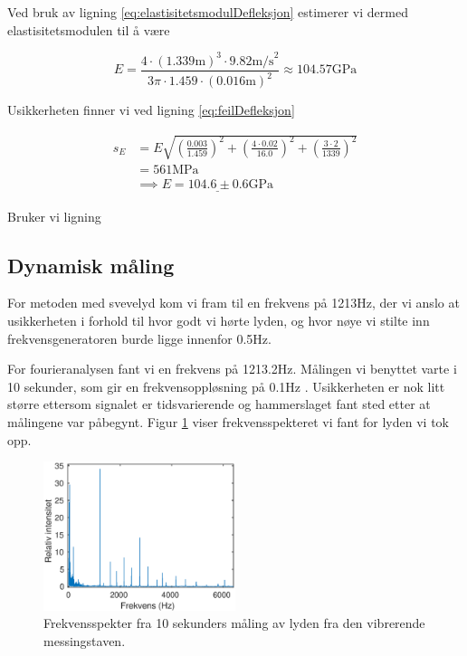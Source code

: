 \documentclass[a4paper,11pt, twocolumn]{article}
\begin{document}
Ved bruk av ligning \eqref{eq:elastisitetsmodulDefleksjon} estimerer vi dermed elastisitetsmodulen til å være

\begin{equation}
	E = \frac{4\cdot(1.339\text{m})^3\cdot9.82\text{m/s}^2}{3\pi\cdot 1.459\cdot (0.016\text{m})^2} \approx 104.57\text{GPa}
\end{equation}

Usikkerheten finner vi ved ligning \eqref{eq:feilDefleksjon}

\begin{align}
	s_E &= E\sqrt{\left(\frac{0.003}{1.459}\right)^2+\left(\frac{4\cdot0.02}{16.0}\right)^2+\left(\frac{3\cdot 2}{1339}\right)^2}\\
	&= 561\text{MPa}\\
	&\implies \underline{E = 104.6\pm0.6\text{GPa}}
\end{align}

Bruker vi ligning


\subsection{Dynamisk måling}
For metoden med svevelyd kom vi fram til en frekvens på 1213Hz, der vi anslo at usikkerheten i forhold til hvor godt vi hørte lyden, og hvor nøye vi stilte inn frekvensgeneratoren burde ligge innenfor 0.5Hz. 

For fourieranalysen fant vi en frekvens på 1213.2Hz. Målingen vi benyttet varte i 10 sekunder, som gir en frekvensoppløsning på 0.1Hz \cite{vistnes4}. Usikkerheten er nok litt større ettersom signalet er tidsvarierende og hammerslaget fant sted etter at målingene var påbegynt. Figur \ref{fig:frekvensspekter} viser frekvensspekteret vi fant for lyden vi tok opp.

\begin{figure}[!ht]
	\includegraphics[width = 0.5\textwidth]{matlab/frekvensspekter.eps}
	\caption{Frekvensspekter fra 10 sekunders måling av lyden fra den vibrerende messingstaven.}
	\label{fig:frekvensspekter}
\end{figure}
\end{document}

